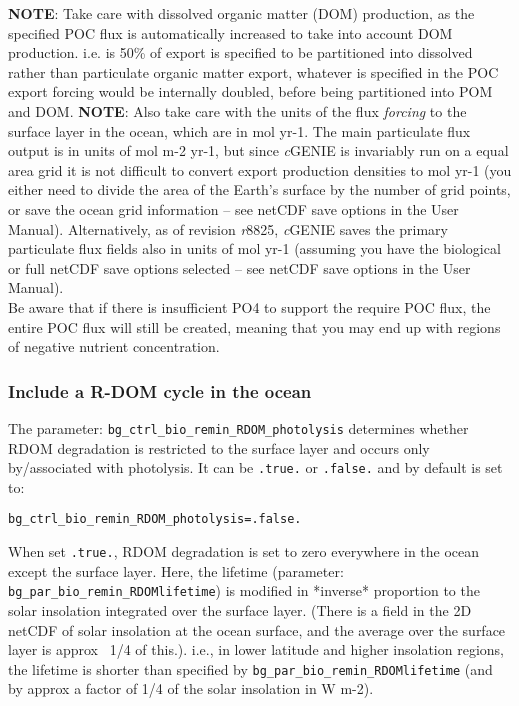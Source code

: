 \documentclass[11pt,fleqn]{book} %
\begin{document}
\begin{enumerate}[noitemsep]
\noindent \textbf{NOTE}: Take care with dissolved organic matter (DOM) production, as the specified POC flux is automatically increased to take into account DOM production. i.e. is 50\% of export is specified to be partitioned into dissolved rather than particulate organic matter export, whatever is specified in the POC export forcing would be internally doubled, before being partitioned into POM and DOM.
\noindent \textbf{NOTE}: Also take care with the units of the flux \textit{forcing} to the surface layer in the ocean, which are in mol yr-1. The main particulate flux output is in units of mol m-2 yr-1, but since \textit{c}GENIE is invariably run on a equal area grid it is not difficult to convert export production densities to mol yr-1 (you either need to divide the area of the Earth's surface by the number of grid points, or save the ocean grid information -- see netCDF save options in the User Manual). Alternatively, as of revision \textit{r}8825, \textit{c}GENIE saves the primary particulate flux fields also in units of mol yr-1 (assuming you have the biological or full netCDF save options selected -- see netCDF save options in the User Manual).
\\Be aware that if there is insufficient PO4 to support the require POC flux, the entire POC flux will still be created, meaning that you may end up with regions of negative nutrient concentration.

\end{enumerate}

%
\subsubsection{Include a R-DOM cycle in the ocean}
\vspace{1mm}

The parameter: \texttt{bg\_ctrl\_bio\_remin\_RDOM\_photolysis} determines whether RDOM degradation is restricted to the surface layer and occurs only by/associated with photolysis. It can be \texttt{.true.} or \texttt{.false.} and by default is set to:
\vspace{-2pt}\begin{verbatim}
bg_ctrl_bio_remin_RDOM_photolysis=.false.
\end{verbatim}\vspace{-2pt}
When set \texttt{.true.}, RDOM degradation is set to zero everywhere in the ocean except the surface layer. Here, the lifetime (parameter: \texttt{bg\_par\_bio\_remin\_RDOMlifetime}) is modified in *inverse* proportion to the solar insolation integrated over the surface layer. (There is a field in the 2D netCDF of solar insolation at the ocean surface, and the average over the surface layer is approx ~1/4 of this.). i.e., in lower latitude and higher insolation regions, the lifetime is shorter than specified by \texttt{bg\_par\_bio\_remin\_RDOMlifetime} (and by approx a factor of 1/4 of the solar insolation in W m-2).
\end{document}
